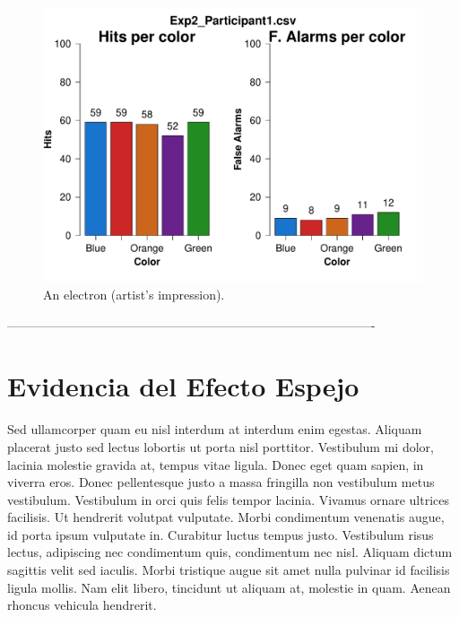 \begin{figure}[th]
\centering
\includegraphics{Figures/Color_Exp2_P1} %

\decoRule
\caption[An Electron]{An electron (artist's impression).}
\label{fig:Electron}
\end{figure}



----------------------------------------------------------------------------------------

\section{Evidencia del Efecto Espejo}

Sed ullamcorper quam eu nisl interdum at interdum enim egestas. Aliquam placerat justo sed lectus lobortis ut porta nisl porttitor. Vestibulum mi dolor, lacinia molestie gravida at, tempus vitae ligula. Donec eget quam sapien, in viverra eros. Donec pellentesque justo a massa fringilla non vestibulum metus vestibulum. Vestibulum in orci quis felis tempor lacinia. Vivamus ornare ultrices facilisis. Ut hendrerit volutpat vulputate. Morbi condimentum venenatis augue, id porta ipsum vulputate in. Curabitur luctus tempus justo. Vestibulum risus lectus, adipiscing nec condimentum quis, condimentum nec nisl. Aliquam dictum sagittis velit sed iaculis. Morbi tristique augue sit amet nulla pulvinar id facilisis ligula mollis. Nam elit libero, tincidunt ut aliquam at, molestie in quam. Aenean rhoncus vehicula hendrerit.